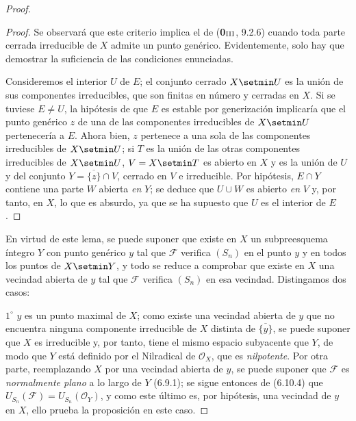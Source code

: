 \begin{proof}
\begin{proof}
Se observará que este criterio implica el de (\textbf{0}$_{\rm III}$, 9.2.6)
cuando toda parte cerrada irreducible de $X$ admite un punto genérico.
Evidentemente, solo hay que demostrar la suficiencia de las condiciones enunciadas.

Consideremos el interior $U$ de $E$; el conjunto cerrado $X\setmin U$ es la unión de
sus componentes irreducibles, que son finitas en número y cerradas en $X$.
Si se tuviese $E\ne U$, la hipótesis de que $E$ es estable por generización
implicaría que el punto genérico $z$ de una de las componentes irreducibles
de $X\setmin U$ pertenecería a $E$. Ahora bien, $z$ pertenece a una sola de las
componentes irreducibles de $X\setmin U$; si $T$ es la unión de las otras
componentes irreducibles de $X\setmin U$, $V=X\setmin T$ es abierto en $X$ y es la unión de
$U$ y del conjunto $Y=\overline{\{z\}}\cap V$, cerrado en $V$ e
irreducible. Por hipótesis, $E\cap Y$ contiene una parte $W$ abierta \emph{en}
$Y$; se deduce que $U\cup W$ es abierto \emph{en} $V$ y, por tanto, en $X$, lo que
es absurdo, ya que se ha supuesto que $U$ es el interior de $E$.
\end{proof}

En virtud de este lema, se puede suponer que existe en $X$ un
subpreesquema íntegro $Y$ con punto genérico $y$ tal que $\mathcal F$
verifica $(S_n)$ en el punto $y$ y en todos los puntos de $X\setmin Y$, y todo se
reduce a comprobar que existe en $X$ una vecindad abierta de $y$ tal que
$\mathcal F$ verifica $(S_n)$ en esa vecindad. Distingamos dos casos:

$1^\circ$ $y$ es un punto maximal de $X$; como existe una vecindad abierta
de $y$ que no encuentra ninguna componente irreducible de $X$ distinta de
$\overline{\{y\}}$, se puede suponer que $X$ es irreducible y, por tanto, tiene el mismo
espacio subyacente que $Y$, de modo que $Y$ está definido por el Nilradical de
$\mathcal O_X$, que es \emph{nilpotente}. Por otra parte, reemplazando $X$
por una vecindad abierta de $y$, se puede suponer que $\mathcal F$ es \emph{normalmente
plano} a lo largo de $Y$ (6.9.1); se sigue entonces de (6.10.4) que
$U_{S_n}(\mathcal F)=U_{S_n}(\mathcal O_Y)$, y como este último es, por
hipótesis, una vecindad de $y$ en $X$, ello prueba la proposición en este
caso.



\end{proof}
